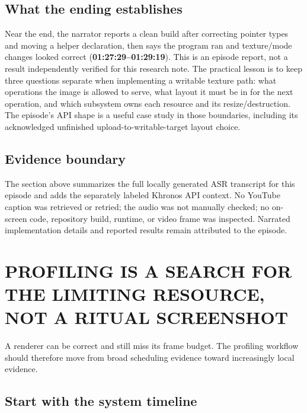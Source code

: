 \subsection{What the ending establishes}\label{05-engine-i-ch008-what-the-ending-establishes}

Near the end, the narrator reports a clean build after correcting pointer types and moving a helper declaration, then says the program ran and texture/mode changes looked correct (\textbf{01:27:29--01:29:19}). This is an episode report, not a result independently verified for this research note. The practical lesson is to keep three questions separate when implementing a writable texture path: what operations the image is allowed to serve, what layout it must be in for the next operation, and which subsystem owns each resource and its resize/destruction. The episode's API shape is a useful case study in those boundaries, including its acknowledged unfinished upload-to-writable-target layout choice.

\subsection{Evidence boundary}\label{05-engine-i-ch008-evidence-boundary-1}

The section above summarizes the full locally generated ASR transcript for this episode and adds the separately labeled Khronos API context. No YouTube caption was retrieved or retried; the audio was not manually checked; no on-screen code, repository build, runtime, or video frame was inspected. Narrated implementation details and reported results remain attributed to the episode.

\section{PROFILING IS A SEARCH FOR THE LIMITING RESOURCE, NOT A RITUAL SCREENSHOT}\label{05-engine-i-ch008-profiling-is-a-search-for-the-limiting-resource-not-a-ritual-screenshot}

A renderer can be correct and still miss its frame budget. The profiling workflow should therefore move from broad scheduling evidence toward increasingly local evidence.

\subsection{Start with the system timeline}\label{05-engine-i-ch008-start-with-the-system-timeline}

